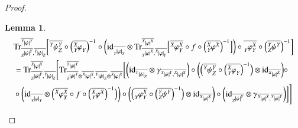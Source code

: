 \documentclass{amsart}
\def\tn{\textnormal}
\def\Trace{\tn{Tr}}
\def\ol{\overline}
\def\id{\tn{id}}
\newcommand{\feeddd}[3]{{\tensor*[^{#2}_{\color{white}{!}}]{{|#1|}}{^{#3}}}}%
\newcommand{\feeddc}[3]{{\tensor*[^{#2}]{{|#1|}}{_{#3}}}}
\newcommand{\feedcd}[3]{{\tensor*[_{#2}]{{|#1|}}{^{#3}}}}
\newcommand{\feedcc}[3]{{\tensor*[^{\color{white}{!}}_{#2}]{{|#1|}}{_{#3}}}}
\newcommand{\feedda}[3]{{\tensor*[^{#2}_{\color{white}{!}}]{{#1}}{^{#2}_{#3}}}}
\newcommand{\feedca}[3]{{\tensor*[_{#2}]{{#1}}{_{#2}^{#3}}}}
\newcommand{\feedad}[3]{{\tensor*[^{#2}_{#3}]{{#1}}{^{#2}}}}
\newcommand{\feedac}[3]{{\tensor*[_{#2}^{#3}]{{#1}}{_{#2}}}}
\newtheorem{lemma}[subsubsection]{Lemma}
\theoremstyle{remark}
\theoremstyle{definition}
\begin{document}
\begin{proof}
\begin{lemma}\label{le:combining traces}
\begin{align*}
&\Trace^{\ol{\feeddd{\psi}{Y}{Y}}}_{\ol{\feedcd{\psi}{Z}{Y}},\ol{\feeddc{\psi}{Y}{Z}}}
\bigg[\ol{\feedda{\psi}{Y}{Z}}\circ\Big(\ol{\feedac{\varphi}{Y}{X}}\Big)^{-1}\circ\bigg(\id_{\ol{\feedcc{\varphi}{Y}{Y}}}\otimes \Trace^{\ol{\feeddd{\varphi}{X}{X}}}_{\ol{\feedcd{\varphi}{Y}{X}},\ol{\feeddc{\varphi}{X}{Y}}}\Big[\ol{\feedda{\varphi}{X}{Y}}\circ f\circ\Big(\ol{\feedad{\varphi}{X}{Y}}\Big)^{-1}\Big]\bigg)\circ\ol{\feedca{\varphi}{Y}{X}}\circ\Big(\ol{\feedad{\psi}{Y}{Z}}\Big)^{-1}\bigg]\\
&=\Trace^{\ol{\feeddd{\varphi}{X}{X}}}_{\ol{\feedcd{\psi}{Z}{Y}},\ol{\feeddc{\psi}{Y}{Z}}}\Bigg[
\Trace^{\ol{\feeddd{\psi}{Y}{Y}}}_{\ol{\feedcd{\psi}{Z}{Y}}\otimes\ol{\feeddd{\varphi}{X}{X}},\ol{\feeddc{\psi}{Y}{Z}}\otimes\ol{\feeddd{\varphi}{X}{X}}}\bigg[
\bigg(\id_{\ol{\feeddc{\psi}{Y}{Z}}}\otimes\gamma_{\ol{\feeddd{\psi}{Y}{Y}},\ol{\feeddd{\varphi}{X}{X}}}\bigg)\circ\bigg(\Big(\ol{\feedda{\psi}{Y}{Z}}\circ\Big(\ol{\feedac{\varphi}{Y}{X}}\Big)^{-1}\Big)\otimes\id_{\ol{\feeddd{\varphi}{X}{X}}}\bigg)\circ\\
&\circ\bigg(\id_{\ol{\feedcc{\varphi}{Y}{Y}}}\otimes\Big(\ol{\feedda{\varphi}{X}{Y}}\circ f\circ\Big(\ol{\feedad{\varphi}{X}{Y}}\Big)^{-1}\Big)\bigg)\circ\bigg(\Big(\ol{\feedca{\varphi}{Y}{X}}\circ\Big(\ol{\feedad{\psi}{Y}{Z}}\Big)^{-1}\Big)\otimes\id_{\ol{\feeddd{\varphi}{X}{X}}}\bigg)\circ\bigg(\id_{\ol{\feedcd{\psi}{Z}{Y}}}\otimes\gamma_{\ol{\feeddd{\varphi}{X}{X}},\ol{\feeddd{\psi}{Y}{Y}}}\bigg)\bigg]\Bigg]\\
\end{align*}
\end{lemma}


\end{proof}
\end{document}

